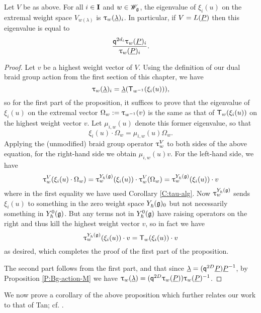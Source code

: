 \begin{proposition}\label{P:extremal-weight}
    Let $V$ be as above.
    For all $i\in\I$ and $w\in\Wg$, the eigenvalue of $\xi_i(u)$ on the extremal weight space $V_{w(\lambda)}$ is $\braid_w(\ul)_i$.
    In particular, if $V=L(\uP)$ then this eigenvalue is equal to
    \[\frac{\q^{2d_i}\braid_w(\uP)_i}{\braid_w(\uP)_i}.\]
\end{proposition}
\begin{proof}
    Let $v$ be a highest weight vector of $V$.
    Using the definition of our dual braid group action from the first section of this chapter, we have
    \[\braid_w(\ul)_i = \ul(\mbraid_{w^{-1}}(\xi_i(u))),\]
    so for the first part of the proposition, it suffices to prove that the eigenvalue of $\xi_i(u)$ on the extremal vector $\Omega_w := \braid_{w^{-1}}(v)$ is the same as that of $\mbraid_w(\xi_i(u))$ on the highest weight vector $v$.
    Let $\mu_{i,w}(u)$ denote this former eigenvalue, so that
    \[\xi_i(u)\cdot\Omega_w = \mu_{i,w}(u)\Omega_w.\]
    Applying the (unmodified) braid group operator $\braid^V_w$ to both sides of the above equation, for the right-hand side we obtain $\mu_{i,w}(u)v$.
    For the left-hand side, we have
    \[\braid^V_w(\xi_i(u)\cdot\Omega_w) = \braid^{\Yhg}_w(\xi_i(u))\cdot\braid^V_w(\Omega_w) = \braid^{\Yhg}_w(\xi_i(u))\cdot v\]
    where in the first equality we have used Corollary \ref{C:tau-alg}.
    Now $\braid^{\Yhg}_w$ sends $\xi_i(u)$ to something in the zero weight space $\Yhg_0$ but not necessarily something in $\Yhg[0]$.
    But any terms not in $\Yhg[0]$ have raising operators on the right and thus kill the highest weight vector $v$, so in fact we have
    \[\braid^{\Yhg}_w(\xi_i(u))\cdot v = \mbraid_w(\xi_i(u))\cdot v\]
    as desired, which completes the proof of the first part of the proposition.

    The second part follows from the first part, and that since $\ul = (\q^{2D}\uP)\uP^{-1}$, by Proposition \ref{P:Bg-action-M} we have $\braid_w(\ul) = (\q^{2D}\braid_w(\uP))\braid_w(\uP)^{-1}$.
\end{proof}

We now prove a corollary of the above proposition which further relates our work to that of Tan; cf. \cite[Prop. 4.5]{tan_braid_2015}.

